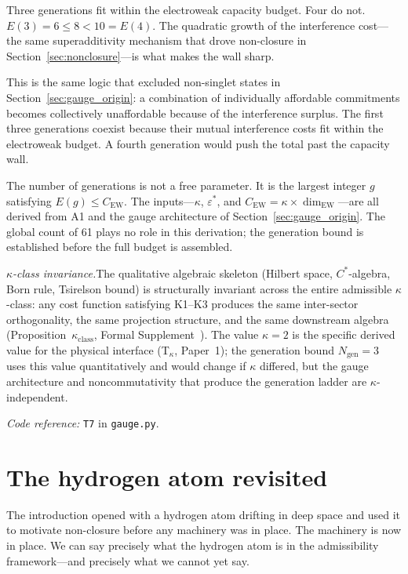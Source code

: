 \documentclass[11pt]{article}
\newcommand{\coderef}[2]{\smallskip\noindent\textit{Code reference:} \texttt{#1} in \texttt{#2}.}
\begin{document}
Three generations fit within the electroweak capacity budget.  Four do not.  $E(3) = 6 \le 8 < 10 = E(4)$.  The quadratic growth of the interference cost---the same superadditivity mechanism that drove non-closure in Section~\ref{sec:nonclosure}---is what makes the wall sharp.

This is the same logic that excluded non-singlet states in Section~\ref{sec:gauge_origin}: a combination of individually affordable commitments becomes collectively unaffordable because of the interference surplus.  The first three generations coexist because their mutual interference costs fit within the electroweak budget.  A fourth generation would push the total past the capacity wall.

The number of generations is not a free parameter.  It is the largest integer $g$ satisfying $E(g) \le C_{\mathrm{EW}}$.  The inputs---$\kappa$, $\varepsilon^*$, and $C_{\mathrm{EW}} = \kappa \times \dim_{\mathrm{EW}}$---are all derived from A1 and the gauge architecture of Section~\ref{sec:gauge_origin}.  The global count of 61 plays no role in this derivation; the generation bound is established before the full budget is assembled.

\smallskip
\noindent\textit{$\kappa$-class invariance.}\quad The qualitative algebraic skeleton (Hilbert space, $C^*$-algebra, Born rule, Tsirelson bound) is structurally invariant across the entire admissible $\kappa$-class: any cost function satisfying K1--K3 produces the same inter-sector orthogonality, the same projection structure, and the same downstream algebra (Proposition~$\kappa_{\mathrm{class}}$, Formal Supplement~\cite{BrookeSupplement}).  The value $\kappa = 2$ is the specific derived value for the physical interface (T$_\kappa$, Paper~1); the generation bound $N_{\mathrm{gen}} = 3$ uses this value quantitatively and would change if $\kappa$ differed, but the gauge architecture and noncommutativity that produce the generation ladder are $\kappa$-independent.


\coderef{T7}{gauge.py}


\section{The hydrogen atom revisited}
\label{sec:hydrogen_revisited}

The introduction opened with a hydrogen atom drifting in deep space and
used it to motivate non-closure before any machinery was in place.  The
machinery is now in place.  We can say precisely what the hydrogen atom
is in the admissibility framework---and precisely what we cannot yet say.
\end{document}
